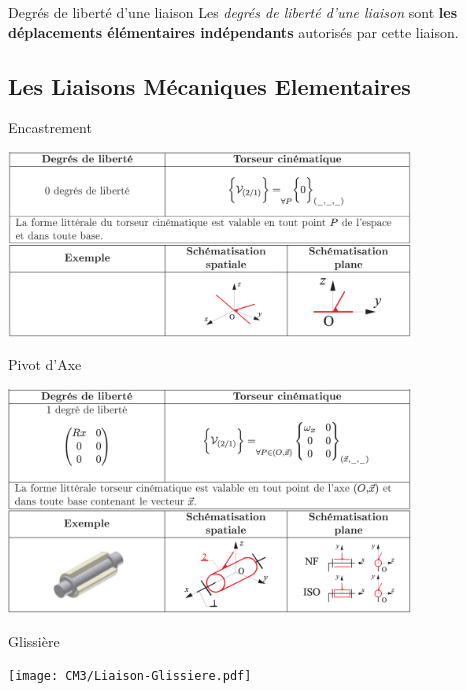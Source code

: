 \documentclass[
  ignorenonframetext,
  aspectratio=169,
  c]{beamer}
\begin{document}
\begin{frame}{Degrés de liberté d'une liaison}
Les \emph{degrés de liberté d'une liaison} sont \textbf{les déplacements
élémentaires indépendants} autorisés par cette liaison.
\end{frame}

\subsection{Les Liaisons Mécaniques
Elementaires}\label{les-liaisons-muxe9caniques-elementaires}

\begin{frame}{Encastrement}
\label{encastrement}
\begin{center}
\includegraphics[width=0.8\textwidth,height=\textheight]{CM3/Liaison-Encastrement.png}
\end{center}
\end{frame}

\begin{frame}{Pivot d'Axe}
\label{pivot-daxe}
\begin{center}
\includegraphics[width=0.8\textwidth,height=\textheight]{CM3/Liaison-Pivot.png}
\end{center}
\end{frame}

\begin{frame}{Glissière}
\label{glissiuxe8re}
\begin{center}
\texttt{[image: CM3/Liaison-Glissiere.pdf]}
\end{center}
\end{frame}
\end{document}
